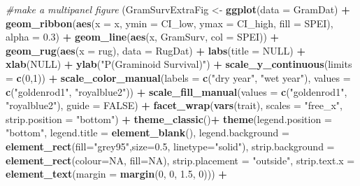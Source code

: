 \documentclass[
]{article}
\newenvironment{Shaded}{\begin{snugshade}}{\end{snugshade}}
\newcommand{\CommentTok}[1]{\textcolor[rgb]{0.56,0.35,0.01}{\textit{#1}}}
\newcommand{\DataTypeTok}[1]{\textcolor[rgb]{0.13,0.29,0.53}{#1}}
\newcommand{\DecValTok}[1]{\textcolor[rgb]{0.00,0.00,0.81}{#1}}
\newcommand{\FloatTok}[1]{\textcolor[rgb]{0.00,0.00,0.81}{#1}}
\newcommand{\KeywordTok}[1]{\textcolor[rgb]{0.13,0.29,0.53}{\textbf{#1}}}
\newcommand{\NormalTok}[1]{#1}
\newcommand{\OperatorTok}[1]{\textcolor[rgb]{0.81,0.36,0.00}{\textbf{#1}}}
\newcommand{\OtherTok}[1]{\textcolor[rgb]{0.56,0.35,0.01}{#1}}
\newcommand{\StringTok}[1]{\textcolor[rgb]{0.31,0.60,0.02}{#1}}
\begin{document}
\begin{Shaded}
\begin{Highlighting}[]
\CommentTok{\#make a multipanel figure}
\NormalTok{(GramSurvExtraFig \textless{}{-}}\StringTok{ }\KeywordTok{ggplot}\NormalTok{(}\DataTypeTok{data =}\NormalTok{ GramDat) }\OperatorTok{+}
\StringTok{  }\KeywordTok{geom\_ribbon}\NormalTok{(}\KeywordTok{aes}\NormalTok{(}\DataTypeTok{x =}\NormalTok{ x, }\DataTypeTok{ymin =}\NormalTok{ CI\_low, }\DataTypeTok{ymax =}\NormalTok{ CI\_high, }\DataTypeTok{fill =}\NormalTok{ SPEI), }\DataTypeTok{alpha =} \FloatTok{0.3}\NormalTok{) }\OperatorTok{+}
\StringTok{  }\KeywordTok{geom\_line}\NormalTok{(}\KeywordTok{aes}\NormalTok{(x, GramSurv, }\DataTypeTok{col =}\NormalTok{ SPEI))  }\OperatorTok{+}\StringTok{ }
\StringTok{  }\KeywordTok{geom\_rug}\NormalTok{(}\KeywordTok{aes}\NormalTok{(}\DataTypeTok{x =}\NormalTok{ rug), }\DataTypeTok{data =}\NormalTok{ RugDat) }\OperatorTok{+}
\StringTok{  }\KeywordTok{labs}\NormalTok{(}\DataTypeTok{title =} \OtherTok{NULL}\NormalTok{) }\OperatorTok{+}
\StringTok{  }\KeywordTok{xlab}\NormalTok{(}\OtherTok{NULL}\NormalTok{) }\OperatorTok{+}
\StringTok{  }\KeywordTok{ylab}\NormalTok{(}\StringTok{"P(Graminoid Survival)"}\NormalTok{) }\OperatorTok{+}
\StringTok{  }\KeywordTok{scale\_y\_continuous}\NormalTok{(}\DataTypeTok{limits =} \KeywordTok{c}\NormalTok{(}\DecValTok{0}\NormalTok{,}\DecValTok{1}\NormalTok{)) }\OperatorTok{+}
\StringTok{  }\KeywordTok{scale\_color\_manual}\NormalTok{(}\DataTypeTok{labels =} \KeywordTok{c}\NormalTok{(}\StringTok{"dry year"}\NormalTok{, }\StringTok{"wet year"}\NormalTok{), }\DataTypeTok{values =} \KeywordTok{c}\NormalTok{(}\StringTok{"goldenrod1"}\NormalTok{, }\StringTok{"royalblue2"}\NormalTok{)) }\OperatorTok{+}
\StringTok{  }\KeywordTok{scale\_fill\_manual}\NormalTok{(}\DataTypeTok{values =} \KeywordTok{c}\NormalTok{(}\StringTok{"goldenrod1"}\NormalTok{, }\StringTok{"royalblue2"}\NormalTok{), }\DataTypeTok{guide =} \OtherTok{FALSE}\NormalTok{) }\OperatorTok{+}
\StringTok{  }\KeywordTok{facet\_wrap}\NormalTok{(}\KeywordTok{vars}\NormalTok{(trait), }\DataTypeTok{scales =} \StringTok{"free\_x"}\NormalTok{, }\DataTypeTok{strip.position =}  \StringTok{"bottom"}\NormalTok{) }\OperatorTok{+}
\StringTok{  }\KeywordTok{theme\_classic}\NormalTok{()}\OperatorTok{+}
\StringTok{  }\KeywordTok{theme}\NormalTok{(}\DataTypeTok{legend.position =} \StringTok{"bottom"}\NormalTok{, }\DataTypeTok{legend.title =} \KeywordTok{element\_blank}\NormalTok{(), }\DataTypeTok{legend.background =} \KeywordTok{element\_rect}\NormalTok{(}\DataTypeTok{fill=}\StringTok{"grey95"}\NormalTok{,}\DataTypeTok{size=}\FloatTok{0.5}\NormalTok{, }\DataTypeTok{linetype=}\StringTok{"solid"}\NormalTok{), }\DataTypeTok{strip.background =} \KeywordTok{element\_rect}\NormalTok{(}\DataTypeTok{colour=}\OtherTok{NA}\NormalTok{, }\DataTypeTok{fill=}\OtherTok{NA}\NormalTok{), }\DataTypeTok{strip.placement =} \StringTok{"outside"}\NormalTok{, }\DataTypeTok{strip.text.x =} \KeywordTok{element\_text}\NormalTok{(}\DataTypeTok{margin =} \KeywordTok{margin}\NormalTok{(}\DecValTok{0}\NormalTok{, }\DecValTok{0}\NormalTok{, }\FloatTok{1.5}\NormalTok{, }\DecValTok{0}\NormalTok{))) }\OperatorTok{+}

\end{Highlighting}
\end{Shaded}
\end{document}
